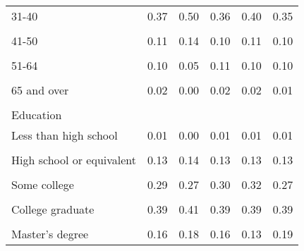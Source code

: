 \begin{tabular*}{\hsize}{@{\hskip\tabcolsep\extracolsep\fill}l*{5}{c}}
\hspace{0.5cm}31-40 &        0.37&        0.50&        0.36&        0.40&        0.35\\
                    &            &            &            &            &            \\
\hspace{0.5cm}41-50 &        0.11&        0.14&        0.10&        0.11&        0.10\\
                    &            &            &            &            &            \\
\hspace{0.5cm}51-64 &        0.10&        0.05&        0.11&        0.10&        0.10\\
                    &            &            &            &            &            \\
\hspace{0.5cm}65 and over&        0.02&        0.00&        0.02&        0.02&        0.01\\
                    &            &            &            &            &            \\
Education           &            &            &            &            &            \\
\hspace{0.5cm}Less than high school&        0.01&        0.00&        0.01&        0.01&        0.01\\
                    &            &            &            &            &            \\
\hspace{0.5cm}High school or equivalent&        0.13&        0.14&        0.13&        0.13&        0.13\\
                    &            &            &            &            &            \\
\hspace{0.5cm}Some college&        0.29&        0.27&        0.30&        0.32&        0.27\\
                    &            &            &            &            &            \\
\hspace{0.5cm}College graduate&        0.39&        0.41&        0.39&        0.39&        0.39\\
                    &            &            &            &            &            \\
\hspace{0.5cm}Master's degree&        0.16&        0.18&        0.16&        0.13&        0.19\\

\end{tabular*}
